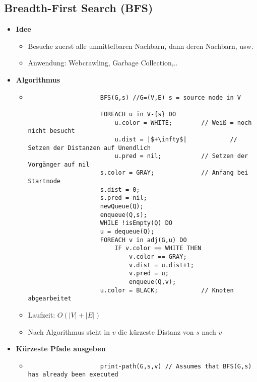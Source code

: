 \subsection{Breadth-First Search (BFS)}
    \begin{itemize}
        \item \textbf{Idee}
            \begin{itemize}
                \item Besuche zuerst alle unmittelbaren Nachbarn, dann deren Nachbarn, usw.
                \item Anwendung: Webcrawling, Garbage Collection,..
            \end{itemize}
        
        \item \textbf{Algorithmus}
            \begin{itemize}
                \item[]
                    \begin{verbatim}
                    BFS(G,s) //G=(V,E) s = source node in V

                    FOREACH u in V-{s} DO
                        u.color = WHITE;        // Weiß = noch nicht besucht
                        u.dist = |$+\infty$|            // Setzen der Distanzen auf Unendlich
                        u.pred = nil;           // Setzen der Vorgänger auf nil
                    s.color = GRAY;             // Anfang bei Startnode
                    s.dist = 0;
                    s.pred = nil;
                    newQueue(Q);
                    enqueue(Q,s);
                    WHILE !isEmpty(Q) DO
                    u = dequeue(Q); 
                    FOREACH v in adj(G,u) DO
                        IF v.color == WHITE THEN
                            v.color == GRAY;
                            v.dist = u.dist+1;
                            v.pred = u;
                            enqueue(Q,v);
                    u.color = BLACK;            // Knoten abgearbeitet
                    \end{verbatim}
                \item Laufzeit: $O(|V| + |E|)$
                \item Nach Algorithmus steht in $v$ die kürzeste Distanz von $s$ nach $v$
            \end{itemize}

\pagebreak

        \item \textbf{Kürzeste Pfade ausgeben}
            \begin{itemize}
                \item[]
                    \begin{verbatim}
                    print-path(G,s,v) // Assumes that BFS(G,s) has already been executed


\end{verbatim}
\end{itemize}
\end{itemize}
